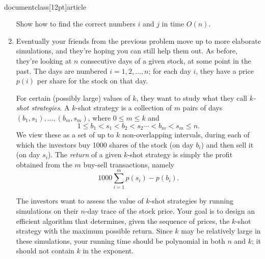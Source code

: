 \\documentclass[12pt]{article}
\begin{document}
\begin{enumerate}
Show how to find the correct numbers $i$ and $j$ in time $O(n)$.




\item

Eventually your friends from the previous problem move up to 
more elaborate simulations, and they're hoping you can still help
them out.
As before, they're looking
at $n$ consecutive days of a given stock,
at some point in the past.
The days are numbered $i = 1, 2, \ldots, n$;
for each day $i$, they have a price $p(i)$ per
share for the stock on that day.

For certain (possibly large) values of $k$, they want to
study what they call {\em $k$-shot strategies}.
A $k$-shot strategy is a collection of $m$
pairs of days $(b_1, s_1), \ldots, (b_m, s_m)$,
where $0 \leq m \leq k$ and
$$1 \leq b_1 < s_1 < b_2 < s_2 \cdots < b_m < s_m \leq n.$$
We view these as a set of up to $k$ non-overlapping intervals,
during each of which the investors buy 1000 shares of the stock
(on day $b_i$) and then sell it (on day $s_i$).
The {\em return} of a given $k$-shot strategy
is simply the profit obtained from the $m$ buy-sell transactions,
namely
$$1000 \sum_{i=1}^m p(s_i) - p(b_i).$$

The investors want to assess the value of $k$-shot strategies
by running simulations on their $n$-day trace of the stock price.
Your goal is to design an efficient algorithm that
determines, given the sequence of prices,
the $k$-shot strategy with the maximum possible return.
Since $k$ may be relatively large in these simulations,
your running time should be polynomial in both $n$ and $k$;
it should not contain $k$ in the exponent.

\end{enumerate}
\end{document}
